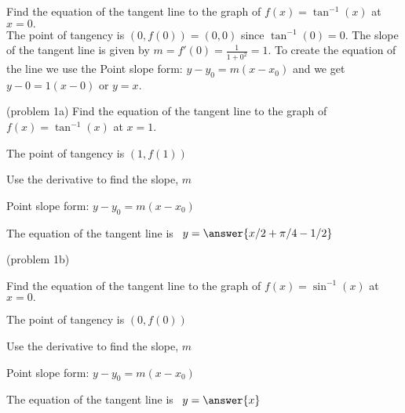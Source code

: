 \documentclass[handout]{ximera}
\begin{document}
\begin{example}[example 1]

Find the equation of the tangent line to the graph of $f(x) = \tan^{-1}(x)$ at $x=0.$\\
The point of tangency is $(0, f(0)) = (0, 0)$ since $\tan^{-1}(0) = 0$.
The slope of the tangent line is given by  $m = f'(0) = \tfrac{1}{1+0^2} = 1$.
To create the equation of the line we use the
Point slope form: $y-y_0 = m(x-x_0)$ and we get $y-0 = 1(x-0)$ or $y=x$.

\end{example}





\begin{problem}(problem 1a)
Find the equation of the tangent line to the graph of $f(x) = \tan^{-1}(x)$ at $x=1.$

\begin{hint}
The point of tangency is $(1, f(1))$
\end{hint}
\begin{hint}
Use the derivative to find the slope, $m$
\end{hint}
\begin{hint}
Point slope form: $y-y_0 = m(x-x_0)$
\end{hint}

The equation of the tangent line is \ $y = \answer{x/2 + \pi/4 - 1/2}$

\end{problem}



\begin{problem}(problem 1b)

Find the equation of the tangent line to the graph of $f(x) = \sin^{-1}(x)$ at $x=0.$

\begin{hint}
The point of tangency is $(0, f(0))$
\end{hint}
\begin{hint}
Use the derivative to find the slope, $m$
\end{hint}
\begin{hint}
Point slope form: $y-y_0 = m(x-x_0)$
\end{hint}

The equation of the tangent line is \ $y = \answer{x}$

\end{problem}
\end{document}

